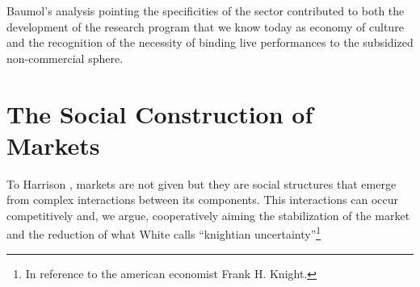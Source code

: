 \documentclass[a4paper, 12pt, openright, oneside, german, french, brazil, english, article]{abntex2}
\begin{document}
	Baumol's analysis pointing the specificities of the sector contributed to both the development of the research program that we know today as economy of culture and the recognition of the necessity of binding live performances to the subsidized non-commercial sphere. 
	
	
	\section{The Social Construction of Markets}
	
	
	To Harrison , markets are not given but they are social structures that emerge from complex interactions between its components. This interactions can occur competitively and, we argue, cooperatively aiming the stabilization of the market and the reduction of what White calls ``knightian uncertainty''\footnote{In reference to the american economist Frank H. Knight.}
	
	
\end{document}
